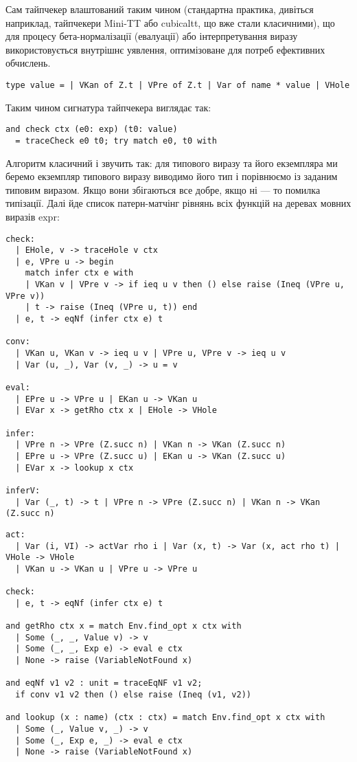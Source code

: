 Сам тайпчекер влаштований таким чином (стандартна практика, дивіться
наприклад, тайпчекери Mini-TT або cubicaltt, що вже стали класичними),
що для процесу бета-нормалізації (евалуації) або інтерпретування виразу
використовується внутрішнє уявлення, оптимізоване для потреб ефективних обчислень.

\begin{lstlisting}
type value = | VKan of Z.t | VPre of Z.t | Var of name * value | VHole
\end{lstlisting}

Таким чином сигнатура тайпчекера виглядає так:

\begin{lstlisting}
and check ctx (e0: exp) (t0: value)
  = traceCheck e0 t0; try match e0, t0 with
\end{lstlisting}

Алгоритм класичний і звучить так: для типового виразу та його
екземпляра ми беремо екземпляр типового виразу виводимо його
тип і порівнюємо із заданим типовим виразом. Якщо вони збігаються
все добре, якщо ні --- то помилка типізації. Далі йде список
патерн-матчінг рівнянь всіх функцій на деревах мовних виразів expr:

\begin{lstlisting}
check:
  | EHole, v -> traceHole v ctx
  | e, VPre u -> begin
    match infer ctx e with
    | VKan v | VPre v -> if ieq u v then () else raise (Ineq (VPre u, VPre v))
    | t -> raise (Ineq (VPre u, t)) end
  | e, t -> eqNf (infer ctx e) t
  
conv:
  | VKan u, VKan v -> ieq u v | VPre u, VPre v -> ieq u v
  | Var (u, _), Var (v, _) -> u = v

eval:
  | EPre u -> VPre u | EKan u -> VKan u
  | EVar x -> getRho ctx x | EHole -> VHole

infer:
  | VPre n -> VPre (Z.succ n) | VKan n -> VKan (Z.succ n)
  | EPre u -> VPre (Z.succ u) | EKan u -> VKan (Z.succ u)
  | EVar x -> lookup x ctx

inferV:
  | Var (_, t) -> t | VPre n -> VPre (Z.succ n) | VKan n -> VKan (Z.succ n)
\end{lstlisting}

\newpage
\begin{lstlisting}
act:
  | Var (i, VI) -> actVar rho i | Var (x, t) -> Var (x, act rho t) | VHole -> VHole
  | VKan u -> VKan u | VPre u -> VPre u

check:
  | e, t -> eqNf (infer ctx e) t

and getRho ctx x = match Env.find_opt x ctx with
  | Some (_, _, Value v) -> v
  | Some (_, _, Exp e) -> eval e ctx
  | None -> raise (VariableNotFound x)

and eqNf v1 v2 : unit = traceEqNF v1 v2;
  if conv v1 v2 then () else raise (Ineq (v1, v2))

and lookup (x : name) (ctx : ctx) = match Env.find_opt x ctx with
  | Some (_, Value v, _) -> v
  | Some (_, Exp e, _) -> eval e ctx
  | None -> raise (VariableNotFound x)
\end{lstlisting}

